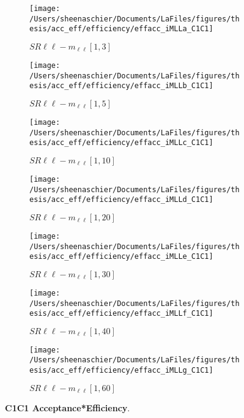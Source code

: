 \begin{figure}
        \centering
    \begin{subfigure}[b]{0.44\textwidth}
        \texttt{[image: /Users/sheenaschier/Documents/LaFiles/figures/thesis/acc\_eff/efficiency/effacc\_iMLLa\_C1C1]}
    \caption{$SR\ell\ell-m_{\ell\ell} [1, 3]$}
    \end{subfigure}
    \begin{subfigure}[b]{0.44\textwidth}
        \texttt{[image: /Users/sheenaschier/Documents/LaFiles/figures/thesis/acc\_eff/efficiency/effacc\_iMLLb\_C1C1]}
    \caption{$SR\ell\ell-m_{\ell\ell} [1, 5]$}
    \end{subfigure}
    \begin{subfigure}[b]{0.44\textwidth}
        \texttt{[image: /Users/sheenaschier/Documents/LaFiles/figures/thesis/acc\_eff/efficiency/effacc\_iMLLc\_C1C1]}
    \caption{$SR\ell\ell-m_{\ell\ell} [1, 10]$}
    \end{subfigure}
    \begin{subfigure}[b]{0.44\textwidth}
        \texttt{[image: /Users/sheenaschier/Documents/LaFiles/figures/thesis/acc\_eff/efficiency/effacc\_iMLLd\_C1C1]}
    \caption{$SR\ell\ell-m_{\ell\ell} [1, 20]$}
    \end{subfigure}
    \begin{subfigure}[b]{0.44\textwidth}
        \texttt{[image: /Users/sheenaschier/Documents/LaFiles/figures/thesis/acc\_eff/efficiency/effacc\_iMLLe\_C1C1]}
    \caption{$SR\ell\ell-m_{\ell\ell} [1, 30]$}
    \end{subfigure}
    \begin{subfigure}[b]{0.44\textwidth}
        \texttt{[image: /Users/sheenaschier/Documents/LaFiles/figures/thesis/acc\_eff/efficiency/effacc\_iMLLf\_C1C1]}
    \caption{$SR\ell\ell-m_{\ell\ell} [1, 40]$}
    \end{subfigure}
    \begin{subfigure}[b]{0.44\textwidth}
        \texttt{[image: /Users/sheenaschier/Documents/LaFiles/figures/thesis/acc\_eff/efficiency/effacc\_iMLLg\_C1C1]}
    \caption{$SR\ell\ell-m_{\ell\ell} [1, 60]$}
    \end{subfigure}
    \caption{\label{fig:c1c1_efficiency_in_acceptance}\textbf{C1C1 Acceptance*Efficiency}.}
\end{figure}
